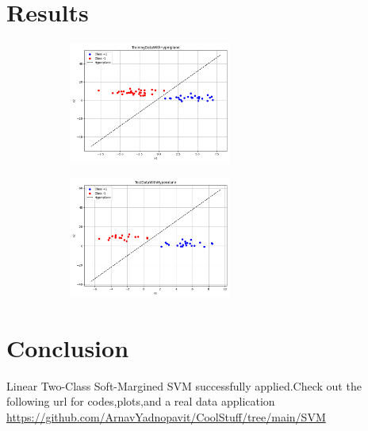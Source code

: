 \documentclass{article}
\begin{document}
\section{Results}
\begin{figure}[H]
    \centering
    \begin{subfigure}{0.5\textwidth}
        \centering
        \includegraphics[height=4cm]{figs/TrainingDataWithHyperplane.png}
    \end{subfigure}%
    \begin{subfigure}{0.5\textwidth}
        \centering
        \includegraphics[height=4cm]{figs/TestDataWithHyperplane.png}
    \end{subfigure}
\end{figure}

\section{Conclusion}

Linear Two-Class Soft-Margined SVM successfully applied.Check out the following url for codes,plots,and a real data application \\
\url{https://github.com/ArnavYadnopavit/CoolStuff/tree/main/SVM}\\
\\\\

\end{document}
